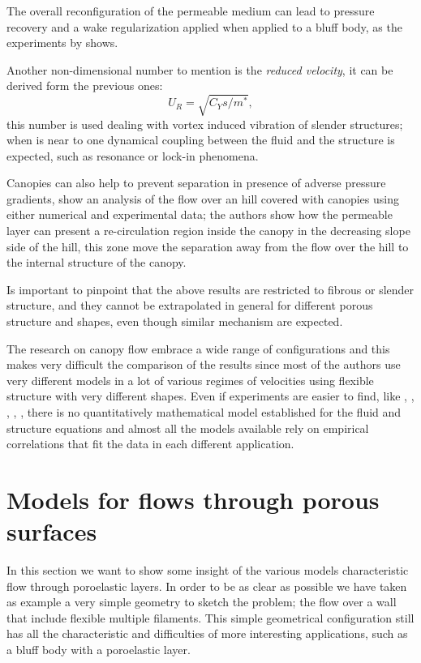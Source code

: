 The overall reconfiguration of the permeable medium can lead to pressure recovery and a wake regularization applied when applied to a bluff body, as the experiments by \citet{gosselin2011drag} shows.

Another non-dimensional number to mention is the \textit{reduced velocity}, it can be derived form the previous ones:
$$ U_R = \sqrt{C_Y s / m^*},$$
this number is used dealing with vortex induced vibration of slender structures; when is near to one dynamical coupling between the fluid and the structure is expected, such as resonance or lock-in phenomena.

Canopies can also help to prevent separation in presence of adverse pressure gradients, \citet{belcher2012wind} show an analysis of the flow over an hill covered with canopies using either numerical and experimental data; the authors show how the permeable layer can present a re-circulation region inside the canopy in the decreasing slope side of the hill, this zone move the separation away from the flow over the hill to the internal structure of the canopy.

Is important to pinpoint that the above results are restricted to fibrous or slender structure, and they cannot be extrapolated in general for different porous structure and shapes, even though similar mechanism are expected.

The research on canopy flow embrace a wide range of configurations and this makes very difficult the comparison of the results since most of the authors use very different models in a lot of various regimes of velocities using flexible structure with very different shapes.
Even if experiments are easier to find, like \citet{segalini2011experimental}, \citet{segalini2013scaling}, \citet{maza2013coupled}, \citet{barsu2016drag}, \citet{alvarado2017nature}, there is no quantitatively mathematical model established for the fluid and structure equations and almost all the models available rely on empirical correlations that fit the data in each different application.


\section{Models for flows through porous surfaces}

In this section we want to show some insight of the various models characteristic flow through poroelastic layers.
In order to be as clear as possible we have taken as example a very simple geometry to sketch the problem; the flow over a wall that include flexible multiple filaments. 
This simple geometrical configuration still has all the characteristic and difficulties of more interesting applications, such as a bluff body with a poroelastic layer.

